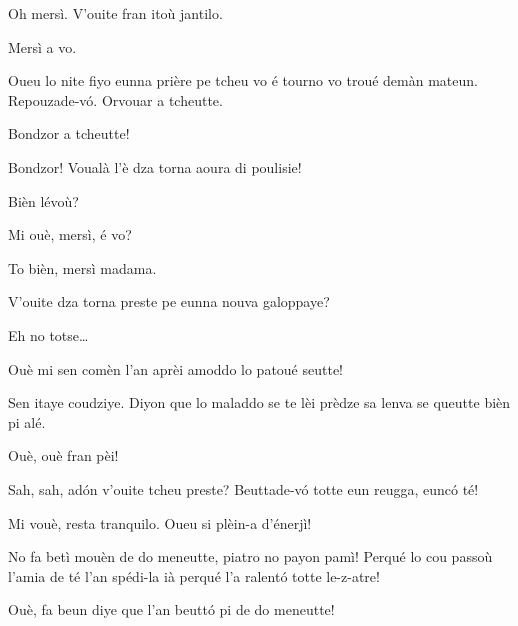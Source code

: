 \begin{drama}

\Priespeaks Oh mersì.  V'ouite fran itoù jantilo.

\Eunfeurmispeaks Mersì a vo.

\Priespeaks Oueu lo nite fiyo eunna prière pe tcheu vo é tourno vo troué demàn mateun. Repouzade-v\'o. Orvouar a tcheutte.




\Fennepulisiespeaks Bondzor a tcheutte!

\Casimirspeaks {} Bondzor! Voualà l'è dza torna aoura di poulisie!

\FennepulisieAspeaks Bièn lévoù?

\Gerominespeaks Mi ouè, mersì, é vo?

\FennepulisieBspeaks To bièn, mersì madama.

\Gerominespeaks V'ouite dza torna preste pe eunna nouva galoppaye?

\FennepulisieBspeaks Eh no totse\ldots

\Casimirspeaks Ouè mi sen comèn l’an aprèi amoddo lo patoué seutte!

\FennepulisieCspeaks Sen itaye coudziye. Diyon que lo maladdo se te lèi prèdze sa lenva se queutte bièn pi alé.

\Casimirspeaks Ouè, ouè fran pèi!


\Starterspeaks Sah, sah, ad\'on v'ouite tcheu preste? Beut\-ta\-de-v\'o totte eun reugga, eunc\'o té!

\FennepulisieAspeaks Mi vouè, resta tranquilo. Oueu si plèin-a d'é\-ner\-jì!

\Starterspeaks No fa betì mouèn de do meneutte, piatro no payon pamì! Perqué lo cou passoù  l'amia de té l’an spédi-la ià perqué l’a ralent\'o totte le-z-atre!

\FennepulisieBspeaks Ouè, fa beun diye que l’an beutt\'o pi de do meneutte!


\end{drama}
